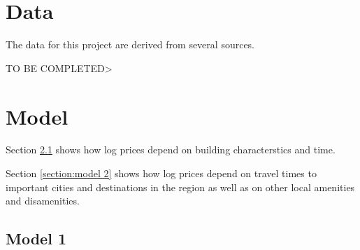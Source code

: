 \documentclass{article}\usepackage[]{graphicx}\usepackage[]{color}
\begin{document}
\section{Data}\label{section:data}

The data for this project are derived from several sources. 

TO BE COMPLETED>

\pagebreak
\section{Model}\label{section:model}
Section \ref{section:model 1} shows how log prices depend on building characterstics and time.

Section \ref{section:model 2} shows how log prices depend on travel times to important cities and destinations in the region as well as on other local amenities and disamenities.

\subsection{Model 1}\label{section:model 1}
\end{document}
